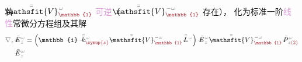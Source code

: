 若 $\Xint{\mathcolor{gray}{-}}{25}{\bar{\bar{\mathsfit{V}}}}^{\;\! \mathcolor{gray}{\omega}}_{\textcolor{Maroon}{\mathbb{1}}}$ \textcolor{Plum}{可逆}（ $\Xint{\mathcolor{gray}{-}}{25}{\bar{\bar{\mathsfit{V}}}}^{\;\! - \mathcolor{gray}{\omega}}_{\textcolor{Maroon}{\mathbb{1}}}$ 存在）， 化为标准一阶\textcolor{Plum}{线性}常微分方程组及其解
\begin{align}
	\mathcolor{gray}{\nabla_z} \Xint{\mathcolor{gray}{-}}{295}{\bar{E}}^{\;\!\mathcolor{gray}{\omega}}_{\;\! \mathcolor{gray}{z}}
	&= \left( \mathbb{i} \Xint{\begin{smallmatrix} ~ \\ {}^{}_{\mathcolor{gray}{-}} \\ ~ \end{smallmatrix}}{15}{\bar{\bar{k}}}_{\textcolor{Maroon}{\symup{z}}}^{\;\! \mathcolor{gray}{\omega}} - \Xint{\mathcolor{gray}{-}}{25}{\bar{\bar{\mathsfit{V}}}}^{\;\! - \mathcolor{gray}{\omega}}_{\textcolor{Maroon}{\mathbb{1}}} \Xint{\mathcolor{gray}{-}}{32}{\bar{\bar{L}}}^{\;\! \mathcolor{gray}{\omega}} \right) \Xint{\mathcolor{gray}{-}}{295}{\bar{E}}^{\;\!\mathcolor{gray}{\omega}}_{\;\! \mathcolor{gray}{z}} - \Xint{\mathcolor{gray}{-}}{25}{\bar{\bar{\mathsfit{V}}}}^{\;\! - \mathcolor{gray}{\omega}}_{\textcolor{Maroon}{\mathbb{1}}} \Xint{\mathcolor{gray}{-}}{30}{\bar{P}}^{\;\! \mathcolor{gray}{\omega}}_{\;\! \mathcolor{gray}{z} \textcolor{Maroon}{(2)}} \label{eq:simplify6-SVA-E'-V_1nonsingular} \\
	\Xint{\mathcolor{gray}{-}}{295}{\bar{E}}^{\;\!\mathcolor{gray}{\omega}}_{\;\! \mathcolor{gray}{z}}

\end{align}
